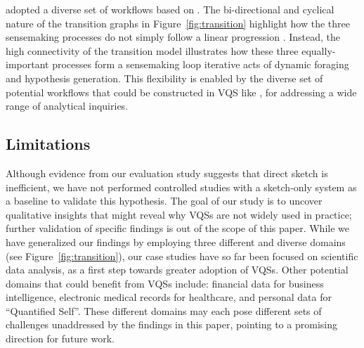 adopted a diverse set of workflows
based on . The bi-directional and cyclical nature
of the transition graphs in Figure~\ref{fig:transition} highlight how the three sensemaking processes do not simply follow a linear progression . %
Instead, the high connectivity of the transition model illustrates how these three equally-important processes form a sensemaking loop iterative acts of dynamic foraging and hypothesis generation. This flexibility is enabled by the diverse set of potential workflows that could be constructed in  VQS like \zvpp, for addressing a wide range of analytical inquiries.%
\subsection{Limitations}
\par Although evidence from our evaluation study
suggests that direct sketch is inefficient,
we have not performed controlled studies
with a sketch-only system as a baseline to validate this hypothesis.
The goal of our study is to uncover qualitative insights
that might reveal why VQSs are not widely used in practice;
further validation of specific findings is out of the scope of this paper.  While we have generalized our findings by employing
three different and diverse domains (see Figure~\ref{fig:transition}),
our case studies have so far
been focused on scientific data analysis,
as a first step towards greater adoption of VQSs.
Other potential domains that could benefit from VQSs include:
financial data for business intelligence,
electronic medical records for healthcare,
and personal data for ``Quantified Self''.
These different domains may each pose different
 sets of challenges unaddressed
 by the findings in this paper,
 pointing to a promising direction for future work.
